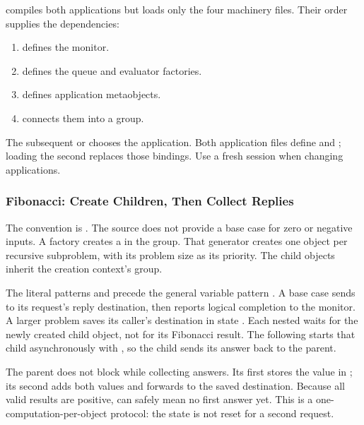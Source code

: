  compiles both applications but loads only the
four machinery files. Their order supplies the dependencies:

\begin{enumerate}[nosep]
  \item {} defines the monitor.
  \item {} defines the queue and evaluator factories.
  \item {} defines application metaobjects.
  \item {} connects them into a group.
\end{enumerate}

The subsequent  or  chooses the
application. Both application files define  and
; loading the second replaces those bindings. Use a fresh
session when changing applications.

\subsubsection{Fibonacci: Create Children, Then Collect Replies}
\label{sec:pcontrol-fib}

The convention is . The source does not provide a base
case for zero or negative inputs. A factory  creates
a  in the  group. That generator creates
one  object per recursive subproblem, with its problem size
as its priority. The child objects inherit the creation context's group.


The literal patterns  and  precede the general
variable pattern . A base case sends \code{[:ans 1]} to its
request's reply destination, then reports logical completion to the
monitor. A larger problem saves its caller's destination in state
. Each nested  waits for
the newly created child object, not for its Fibonacci result.
The following \code{<=} starts that child asynchronously with
, so the child sends its answer back to the parent.

The parent does not block while collecting answers. Its first
\code{[:ans n]} stores the value in ; its
second adds both values and forwards  to the
saved destination. Because all valid results are positive, 
can safely mean no first answer yet. This is a one-computation-per-object
protocol: the state is not reset for a second request.

